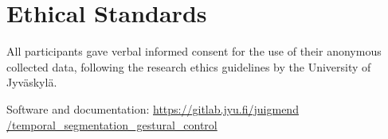 \documentclass{nime-alternate_MANUSCRIPT} %
\begin{document}

\section{Ethical Standards}
All participants gave verbal informed consent for the use of their anonymous collected data, following the research ethics guidelines by the 
University of Jyväskylä.

%


	 

%
%
\appendix
Software and documentation: 
\href{https://gitlab.jyu.fi/juigmend/temporal_segmentation_gestural_control}{https://gitlab.jyu.fi/juigmend\\/temporal\_segmentation\_gestural\_control}
\end{document}
